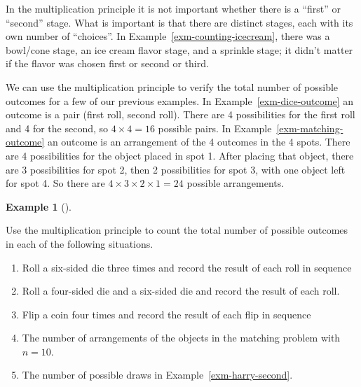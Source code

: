 \documentclass[
  letterpaper,
  DIV=11,
  numbers=noendperiod]{scrreprt}
\providecommand{\tightlist}{%
  \setlength{\itemsep}{0pt}\setlength{\parskip}{0pt}}
\theoremstyle{plain}
\theoremstyle{definition}
\newtheorem{example}{Example}[chapter]
\theoremstyle{definition}
\theoremstyle{definition}
\theoremstyle{remark}
\begin{document}
In the multiplication principle it is not important whether there is a
``first'' or ``second'' stage. What is important is that there are
distinct stages, each with its own number of ``choices''. In
Example~\ref{exm-counting-icecream}, there was a bowl/cone stage, an ice
cream flavor stage, and a sprinkle stage; it didn't matter if the flavor
was chosen first or second or third.

We can use the multiplication principle to verify the total number of
possible outcomes for a few of our previous examples. In
Example~\ref{exm-dice-outcome} an outcome is a pair (first roll, second
roll). There are 4 possibilities for the first roll and 4 for the
second, so \(4\times4 = 16\) possible pairs. In
Example~\ref{exm-matching-outcome} an outcome is an arrangement of the 4
outcomes in the 4 spots. There are 4 possibilities for the object placed
in spot 1. After placing that object, there are 3 possibilities for spot
2, then 2 possibilities for spot 3, with one object left for spot 4. So
there are \(4\times3\times2\times1 = 24\) possible arrangements.

\begin{tcolorbox}[enhanced jigsaw, opacityback=0, left=2mm, colframe=quarto-callout-note-color-frame, toprule=.15mm, breakable, colback=white, leftrule=.75mm, arc=.35mm, rightrule=.15mm, bottomrule=.15mm]

\begin{example}[]\protect\hypertarget{exm-multiplication-rule-outcomes}{}\label{exm-multiplication-rule-outcomes}

Use the multiplication principle to count the total number of possible
outcomes in each of the following situations.

\begin{enumerate}
\def\labelenumi{\arabic{enumi}.}
\tightlist
\item
  Roll a six-sided die three times and record the result of each roll in
  sequence
\item
  Roll a four-sided die and a six-sided die and record the result of
  each roll.
\item
  Flip a coin four times and record the result of each flip in sequence
\item
  The number of arrangements of the objects in the matching problem with
  \(n=10\).
\item
  The number of possible draws in Example~\ref{exm-harry-second}.
\end{enumerate}

\end{example}

\end{tcolorbox}
\end{document}
